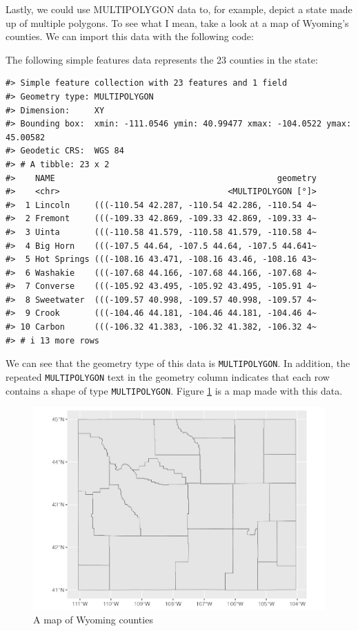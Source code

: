 \documentclass[
]{book}
\begin{document}
Lastly, we could use MULTIPOLYGON data to, for example, depict a state made up of multiple polygons. To see what I mean, take a look at a map of Wyoming's counties. We can import this data with the following code:

The following simple features data represents the 23 counties in the state:

\begin{verbatim}
#> Simple feature collection with 23 features and 1 field
#> Geometry type: MULTIPOLYGON
#> Dimension:     XY
#> Bounding box:  xmin: -111.0546 ymin: 40.99477 xmax: -104.0522 ymax: 45.00582
#> Geodetic CRS:  WGS 84
#> # A tibble: 23 x 2
#>    NAME                                             geometry
#>    <chr>                                  <MULTIPOLYGON [°]>
#>  1 Lincoln     (((-110.54 42.287, -110.54 42.286, -110.54 4~
#>  2 Fremont     (((-109.33 42.869, -109.33 42.869, -109.33 4~
#>  3 Uinta       (((-110.58 41.579, -110.58 41.579, -110.58 4~
#>  4 Big Horn    (((-107.5 44.64, -107.5 44.64, -107.5 44.641~
#>  5 Hot Springs (((-108.16 43.471, -108.16 43.46, -108.16 43~
#>  6 Washakie    (((-107.68 44.166, -107.68 44.166, -107.68 4~
#>  7 Converse    (((-105.92 43.495, -105.92 43.495, -105.91 4~
#>  8 Sweetwater  (((-109.57 40.998, -109.57 40.998, -109.57 4~
#>  9 Crook       (((-104.46 44.181, -104.46 44.181, -104.46 4~
#> 10 Carbon      (((-106.32 41.383, -106.32 41.382, -106.32 4~
#> # i 13 more rows
\end{verbatim}

We can see that the geometry type of this data is \texttt{MULTIPOLYGON}. In addition, the repeated \texttt{MULTIPOLYGON} text in the geometry column indicates that each row contains a shape of type \texttt{MULTIPOLYGON}. Figure \ref{fig:wyoming-counties-map} is a map made with this data.

\begin{figure}
\includegraphics[width=1\linewidth]{maps_files/figure-latex/wyoming-counties-map-1} \caption{A map of Wyoming counties}\label{fig:wyoming-counties-map}
\end{figure}
\end{document}
